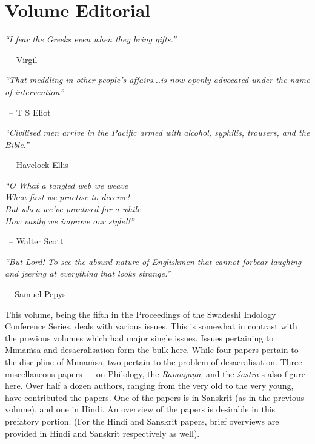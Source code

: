 \chapter*{Volume Editorial}\label{volumeeditorial}

\begin{myquote}
\textit{“I fear the Greeks even when they bring gifts.”} 

~\hfill – Virgil
\end{myquote}

\begin{myquote}
\textit{“That meddling in other people’s affairs...}\textit{is now openly advocated under the name of intervention”} 

~\hfill – T S Eliot
\end{myquote}

\begin{myquote}
\textit{“Civilised men arrive in the Pacific armed with alcohol, syphilis, trousers, and the Bible.”} 

~\hfill – Havelock Ellis
\end{myquote}

\begin{myquote}
\textit{“O What a tangled web we weave\\ When first we practise to deceive!\\ But when we’ve practised for a while\\ How vastly we improve our style!!”} 

~\hfill – Walter Scott
\end{myquote}

\begin{myquote}
\textit{“But Lord! To see the absurd nature of Englishmen that cannot forbear laughing and jeering at everything that looks strange.” }\relax

~\hfill - Samuel Pepys
\end{myquote}

This volume, being the fifth in the Proceedings of the Swadeshi Indology Conference Series, deals with various issues. This is somewhat in contrast with the previous volumes which had major single issues. Issues pertaining to Mīmāṁsā and desacralisation form the bulk here. While four papers pertain to the discipline of Mīmāṁsā, two pertain to the problem of desacralisation. Three miscellaneous papers — on Philology,
 the \textit{Rāmāyaṇa}, and the \textit{śāstra}-s also figure here. Over half a dozen authors, ranging from the very old to the very young, have contributed the papers. One of the papers is in Sanskrit (as in the previous volume), and one in Hindi. An overview of the papers is desirable in this prefatory portion. (For the Hindi and Sanskrit papers, brief overviews are provided in Hindi and Sanskrit respectively as well).


